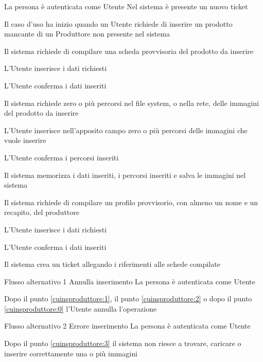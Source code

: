 {}
{La persona è autenticata come Utente}
{Nel sistema è presente un nuovo ticket}
{\begin{enumCU}
		\item Il caso d'uso ha inizio quando un Utente richiede di inserire un prodotto mancante di un Produttore non presente nel sistema
		\item Il sistema richiede di compilare una scheda provvisoria del prodotto da inserire
		\item L'Utente inserisce i dati richiesti \label{cuinsproduttore:1}
		\item L'Utente conferma i dati inseriti 
		\item Il sistema richiede zero o più percorsi nel file system, o nella rete, delle immagini del prodotto da inserire
		\item L'Utente inserisce nell'apposito campo zero o più percorsi delle immagini che vuole inserire \label{cuinsproduttore:2}
		\item L'Utente conferma i percorsi inseriti \label{cuinsproduttore:3}
		\item Il sistema memorizza i dati inseriti, i percorsi inseriti e salva le immagini nel sistema
		\item Il sistema richiede di compilare un profilo provvisorio, con almeno un nome e un recapito, del produttore
		\item L'Utente inserisce i dati richiesti \label{cuinsproduttore:0}
		\item L'Utente conferma i dati inseriti
		\item Il sistema crea un ticket allegando i riferimenti alle schede compilate
	\end{enumCU}}
%
{Flusso alternativo 1}%
{Annulla inserimento}%
{La persona è autenticata come Utente}%
{\postNulle}%
{\begin{enumCU}
		\item Dopo il punto \ref{cuinsproduttore:1}, il punto \ref{cuinsproduttore:2} o dopo il punto \ref{cuinsproduttore:0} l'Utente annulla l'operazione
	\end{enumCU}}%
%
{Flusso alternativo 2}%
{Errore inserimento}%
{La persona è autenticata come Utente}%
{\postNulle}%
{\begin{enumCU}
		\item Dopo il punto \ref{cuinsproduttore:3} il sistema non riesce a trovare, caricare o inserire correttamente una o più immagini
	\end{enumCU}}%




